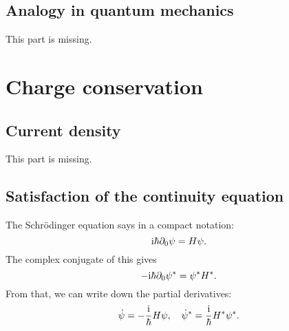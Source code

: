 \documentclass[11pt, english, fleqn, DIV=15, headinclude, BCOR=1cm]{scrartcl}
\begin{document}
\subsection{Analogy in quantum mechanics}

\begin{note}
    This part is missing.
\end{note}

\section{Charge conservation} %

\newcommand\cc{\mathop{}\text{c.c.}}
\newcommand\hc{\mathop{}\text{h.c.}}

\subsection{Current density}

\begin{note}
    This part is missing.
\end{note}

\subsection{Satisfaction of the continuity equation}

The Schrödinger equation says in a compact notation:
\[
    \mathrm i \hbar \partial_0 \psi = H \psi.
\]
The complex conjugate of this gives
\[
    - \mathrm i \hbar \partial_0 \psi^* = \psi^* H^*.
\]
From that, we can write down the partial derivatives:
\[
    \dot \psi = - \frac{\mathrm i}{\hbar} H \psi
    ,\quad
    \dot \psi^* = \frac{\mathrm i}{\hbar} H^* \psi^*.
\]
\end{document}

